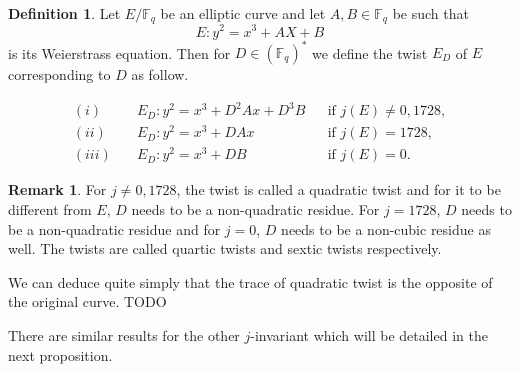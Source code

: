 \documentclass[12pt]{article}
\theoremstyle{plain}
\theoremstyle{definition}
\newtheorem{definition}[theorem]{Definition}
\newtheorem*{remark}{Remark}
\def\F{\ensuremath{\mathbb{F}}}
\begin{document}
\begin{definition}
Let $E/\F_q$ be an elliptic curve and let $A,B\in\F_q$ be such that
\begin{equation}
E : y^2 = x^3 + AX + B
\end{equation}
is its Weierstrass equation. Then for $D\in(\F_q)^*$ we define the twist $E_D$
of $E$ corresponding to $D$ as follow.

\begin{equation*}
\begin{aligned}
(i)\quad & E_D : y^2 = x^3 + D^2Ax + D^3B && \text{if } j(E)\neq0,1728,\\
(ii)\quad & E_D : y^2 = x^3 + DAx && \text{if } j(E)=1728,\\
(iii)\quad & E_D : y^2 = x^3 + DB && \text{if } j(E)=0.
\end{aligned}
\end{equation*}

\end{definition}

\begin{remark}
For $j\neq0,1728$, the twist is called a quadratic twist and for it to be
different from $E$, $D$ needs to be a non-quadratic residue. For $j=1728$, $D$
needs to be a non-quadratic residue and for $j = 0$, $D$ needs to be a
non-cubic residue as well. The twists are called quartic twists and sextic twists
respectively.
\end{remark}

We can deduce quite simply that the trace of quadratic twist is the
opposite of the original curve. TODO\par
There are similar results for the other $j$-invariant which will be detailed in
the next proposition.
\end{document}
